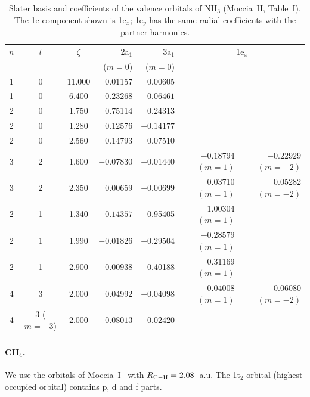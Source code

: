 \documentclass[11pt,a4paper]{article}
\newcommand{\NH}{NH$_3$}
\newcommand{\CH}{CH$_4$}
\newcommand{\aone}{3a$_1$}
\newcommand{\atwo}{2a$_1$}
\begin{document}
\begin{table}[H]\centering\small
\caption{Slater basis and coefficients of the valence orbitals of \NH{} (Moccia~II, Table~I).
The 1e component shown is 1e$_x$; 1e$_y$ has the same radial coefficients with the partner
harmonics.}\label{tab:moccia}
\begin{tabular}{cccrrrr}\toprule
$n$ & $l$ & $\zeta$ & \atwo & \aone & \multicolumn{2}{c}{1e$_x$}\\
 & & & ($m=0$) & ($m=0$) & \multicolumn{2}{c}{}\\\midrule
1 & 0 & 11.000 & 0.01157 & 0.00605 & & \\
1 & 0 & 6.400  & $-0.23268$ & $-0.06461$ & & \\
2 & 0 & 1.750  & 0.75114 & 0.24313 & & \\
2 & 0 & 1.280  & 0.12576 & $-0.14177$ & & \\
2 & 0 & 2.560  & 0.14793 & 0.07510 & & \\
3 & 2 & 1.600  & $-0.07830$ & $-0.01440$ & $-0.18794$ $(m=1)$ & $-0.22929$ $(m=-2)$\\
3 & 2 & 2.350  & 0.00659 & $-0.00699$ & 0.03710 $(m=1)$ & 0.05282 $(m=-2)$\\
2 & 1 & 1.340  & $-0.14357$ & 0.95405 & 1.00304 $(m=1)$ & \\
2 & 1 & 1.990  & $-0.01826$ & $-0.29504$ & $-0.28579$ $(m=1)$ & \\
2 & 1 & 2.900  & $-0.00938$ & 0.40188 & 0.31169 $(m=1)$ & \\
4 & 3 & 2.000  & 0.04992 & $-0.04098$ & $-0.04008$ $(m=1)$ & 0.06080 $(m=-2)$\\
4 & 3 ($m=-3$) & 2.000 & $-0.08013$ & 0.02420 & & \\\bottomrule
\end{tabular}
\end{table}

\paragraph{\CH.} We use the orbitals of Moccia~I~\cite{Moccia1964a} with $R_{\rm C-H}=2.08$~a.u.
The 1t$_2$ orbital (highest occupied orbital) contains p, d and f parts.
\end{document}
